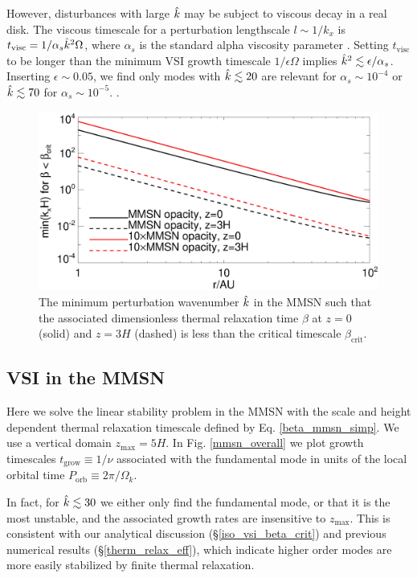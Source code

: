 However, disturbances with large $\hat{k}$ may be subject to viscous
decay in a real disk. The viscous timescale for a perturbation lengthscale 
$l\sim 1/k_x$ is $t_\mathrm{visc} = 1/\alpha_s\hat{k}^2\Omega $, where
$\alpha_s$ is the standard alpha viscosity parameter
\citep{shakura73}. Setting $t_\mathrm{visc}$ to be longer than the
minimum VSI growth timescale $1/\epsilon\Omega$ implies 
$\hat{k}^2\lesssim \epsilon/\alpha_s$. Inserting $\epsilon \sim 0.05$,
we find only modes with $\hat{k}\lesssim 20$ are relevant for
$\alpha_s\sim 10^{-4}$ or $\hat{k}\lesssim 70$ for $\alpha_s\sim
10^{-5}$. \citep[These low viscosity levels are required for the
VSI, see][]{nelson13}.


\begin{figure}
  \includegraphics[width=\linewidth]{figures/bcrit_mink} 
  \caption{The minimum perturbation wavenumber $\hat{k}$ in
    the MMSN such that the associated dimensionless thermal
    relaxation time  $\beta$ at $z=0$ (solid) and $z=3H$ (dashed) is
    less than the critical timescale $\beta_\mathrm{crit}$.   
    \label{mmsn_bcrit_bcool_mink}}   
\end{figure}  


\subsection{VSI in the MMSN}
Here we solve the linear stability problem in the MMSN with the scale and
height dependent thermal relaxation timescale defined by
Eq. \ref{beta_mmsn_simp}.  We use a vertical 
domain $z_\mathrm{max}=5H$. In Fig. \ref{mmsn_overall} we plot growth
timescales $t_\mathrm{grow} \equiv 1/\nu$ associated with the
fundamental mode in units of the local orbital time
$P_\mathrm{orb}\equiv 2\pi/\Omega_k$.    

In fact, for $\hat{k} \lesssim 30$ we either only find the
fundamental mode, or that it is the most unstable, and the associated
growth rates are insensitive to $z_\mathrm{max}$. This is consistent with our
analytical discussion (\S\ref{iso_vsi_beta_crit}) and previous
numerical results (\S\ref{therm_relax_eff}), which indicate  
higher order modes are more easily stabilized by finite thermal
relaxation.   

